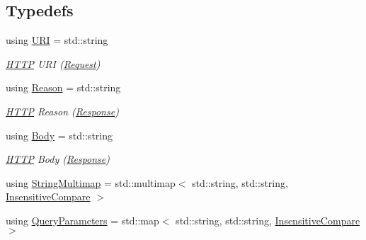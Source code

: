 \subsection*{Typedefs}
\begin{DoxyCompactItemize}
\item 
using \mbox{\hyperlink{namespaceo_z_1_1_h_t_t_p_a6d47156e2eac27750983fc1b54bd2ff8}{U\+RI}} = std\+::string
\begin{DoxyCompactList}\small\item\em \mbox{\hyperlink{namespaceo_z_1_1_h_t_t_p}{H\+T\+TP}} U\+RI (\mbox{\hyperlink{classo_z_1_1_h_t_t_p_1_1_request}{Request}}) \end{DoxyCompactList}\item 
using \mbox{\hyperlink{namespaceo_z_1_1_h_t_t_p_afcd8b91e5e8a7b6df0a7b3b298ec3965}{Reason}} = std\+::string
\begin{DoxyCompactList}\small\item\em \mbox{\hyperlink{namespaceo_z_1_1_h_t_t_p}{H\+T\+TP}} Reason (\mbox{\hyperlink{classo_z_1_1_h_t_t_p_1_1_response}{Response}}) \end{DoxyCompactList}\item 
using \mbox{\hyperlink{namespaceo_z_1_1_h_t_t_p_a270c38b9f9b6228ce430fda6d5b150d6}{Body}} = std\+::string
\begin{DoxyCompactList}\small\item\em \mbox{\hyperlink{namespaceo_z_1_1_h_t_t_p}{H\+T\+TP}} Body (\mbox{\hyperlink{classo_z_1_1_h_t_t_p_1_1_response}{Response}}) \end{DoxyCompactList}\item 
using \mbox{\hyperlink{namespaceo_z_1_1_h_t_t_p_a339aac279d709cfa16148ad073500fc1}{String\+Multimap}} = std\+::multimap$<$ std\+::string, std\+::string, \mbox{\hyperlink{structo_z_1_1_h_t_t_p_1_1_insensitive_compare}{Insensitive\+Compare}} $>$
\item 
using \mbox{\hyperlink{namespaceo_z_1_1_h_t_t_p_adf31e2c29997ec6637f36d62ab8944d6}{Query\+Parameters}} = std\+::map$<$ std\+::string, std\+::string, \mbox{\hyperlink{structo_z_1_1_h_t_t_p_1_1_insensitive_compare}{Insensitive\+Compare}} $>$
\end{DoxyCompactItemize}
